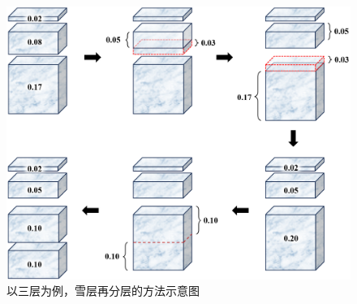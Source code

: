 {
  \begin{figure}[htbp]
    \centering
    \includegraphics[width=0.8\columnwidth]{Figures/雪盖土壤热力过程/以三层为例雪层再分层的方法.png}
    \caption{以三层为例，雪层再分层的方法示意图}
    \label{fig:以三层为例雪层再分层的方法}
  \end{figure}
}
